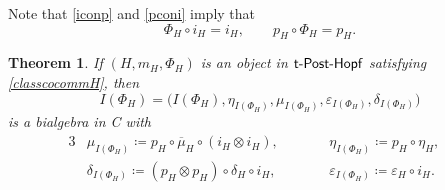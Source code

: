 \documentclass[pdftex]{sigma}
\numberwithin{equation}{section}
\newtheorem{Theorem}{Theorem}[section]
\begin{document}
Note that \eqref{iconp} and \eqref{pconi} imply that
\begin{equation}\label{Phiconi}
\Phi_{H}\circ i_{H}=i_{H},\qquad p_{H}\circ \Phi_{H}=p_{H}.
\end{equation}
\begin{Theorem}\label{bialgIphi}
If $(H,m_{H},\Phi_{H})$ is an object in ${\sf t}\textnormal{-}\sf{Post}\textnormal{-}\sf{Hopf}$ satisfying \eqref{classcocommH}, then \[I(\Phi_{H})=\bigl(I(\Phi_{H}),\eta_{I(\Phi_{H})},\mu_{I(\Phi_{H})},\varepsilon_{I(\Phi_{H})},\delta_{I(\Phi_{H})}\bigr)\] is a bialgebra in {\sf C} with
\begin{alignat*}{3}
&\mu_{I(\Phi_{H})}\coloneqq p_{H}\circ\overline{\mu}_{H}\circ (i_{H}\otimes i_{H}),\qquad&&
\eta_{I(\Phi_{H})}\coloneqq p_{H}\circ \eta_{H},\\
&\delta_{I(\Phi_{H})}\coloneqq (p_{H}\otimes p_{H})\circ\delta_{H}\circ i_{H},\qquad&&
\varepsilon_{I(\Phi_{H})}\coloneqq \varepsilon_{H}\circ i_{H}.&
\end{alignat*}
\end{Theorem}
\end{document}
